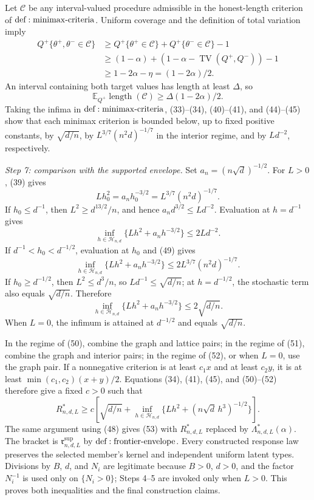 Let \(\mathcal C\) be any interval-valued procedure admissible in the honest-length criterion of \({\rm def:minimax\text{-}criteria}\).  Uniform coverage and the definition of total variation imply
\[
 \begin{aligned}
 Q^+\{\theta^+,\theta^-\in\mathcal C\}
 &\geq Q^+\{\theta^+\in\mathcal C\}
      +Q^+\{\theta^-\in\mathcal C\}-1\\
 &\geq(1-\alpha)+(1-\alpha-\operatorname{TV}(Q^+,Q^-))-1\\
 &\geq1-2\alpha-\eta=(1-2\alpha)/2.
 \end{aligned}
\tag{47}
\]
An interval containing both target values has length at least \(\Delta\), so
\[
 \mathbb E_{Q^+}\operatorname{length}(\mathcal C)
 \geq\Delta(1-2\alpha)/2.
\tag{48}
\]
Taking the infima in \({\rm def:minimax\text{-}criteria}\), (33)--(34), (40)--(41), and (44)--(45) show that each minimax criterion is bounded below, up to fixed positive constants, by \(\sqrt{d/n}\), by \(L^{3/7}(n^2d)^{-1/7}\) in the interior regime, and by \(Ld^{-2}\), respectively.

\textit{Step 7: comparison with the supported envelope.}
Set \(a_n=(n\sqrt d)^{-1/2}\).  For \(L>0\), (39) gives
\[
 Lh_0^2=a_nh_0^{-3/2}=L^{3/7}(n^2d)^{-1/7}.
\tag{49}
\]
If \(h_0\leq d^{-1}\), then \(L^2\geq d^{13/2}/n\), and hence \(a_nd^{3/2}\leq Ld^{-2}\).  Evaluation at \(h=d^{-1}\) gives
\[
 \inf_{h\in\mathcal H_{n,d}}\{Lh^2+a_nh^{-3/2}\}
 \leq2Ld^{-2}.
\tag{50}
\]
If \(d^{-1}<h_0<d^{-1/2}\), evaluation at \(h_0\) and (49) gives
\[
 \inf_{h\in\mathcal H_{n,d}}\{Lh^2+a_nh^{-3/2}\}
 \leq2L^{3/7}(n^2d)^{-1/7}.
\tag{51}
\]
If \(h_0\geq d^{-1/2}\), then \(L^2\leq d^3/n\), so \(Ld^{-1}\leq\sqrt{d/n}\); at \(h=d^{-1/2}\), the stochastic term also equals \(\sqrt{d/n}\).  Therefore
\[
 \inf_{h\in\mathcal H_{n,d}}\{Lh^2+a_nh^{-3/2}\}
 \leq2\sqrt{d/n}.
\tag{52}
\]
When \(L=0\), the infimum is attained at \(d^{-1/2}\) and equals \(\sqrt{d/n}\).

In the regime of (50), combine the graph and lattice pairs; in the regime of (51), combine the graph and interior pairs; in the regime of (52), or when \(L=0\), use the graph pair.  If a nonnegative criterion is at least \(c_1x\) and at least \(c_2y\), it is at least \(\min(c_1,c_2)(x+y)/2\).  Equations (34), (41), (45), and (50)--(52) therefore give a fixed \(c>0\) such that
\[
 R^*_{n,d,L}\geq c\left[\sqrt{d/n}+
 \inf_{h\in\mathcal H_{n,d}}\{Lh^2+(n\sqrt d\,h^3)^{-1/2}\}\right].
\tag{53}
\]
The same argument using (48) gives (53) with \(R^*_{n,d,L}\) replaced by \(\Lambda^*_{n,d,L}(\alpha)\).  The bracket is \(\mathfrak r^{\mathrm{sup}}_{n,d,L}\) by \({\rm def:frontier\text{-}envelope}\).  Every constructed response law preserves the selected member's kernel and independent uniform latent types.  Divisions by \(B\), \(d\), and \(N_i\) are legitimate because \(B>0\), \(d>0\), and the factor \(N_i^{-1}\) is used only on \(\{N_i>0\}\); Steps 4--5 are invoked only when \(L>0\).  This proves both inequalities and the final construction claims.